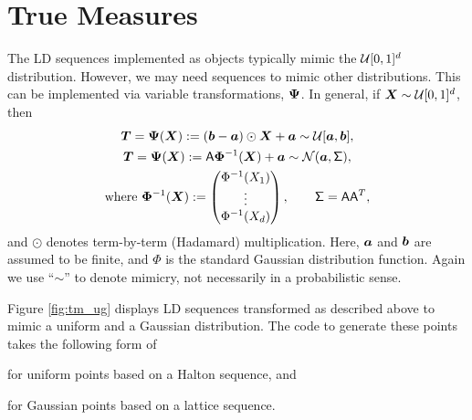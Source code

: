 \documentclass[graybox,footinfo]{svmult}
\newcommand{\mA}{\mathsf{A}}
\newcommand{\mSigma}{\mathsf{\Sigma}}
\begin{document}
\section{True Measures}

The LD sequences implemented as  objects typically mimic the ${\mathcal{U}}[0,1]^d$ distribution.  However, we may need sequences to mimic other distributions.  This can be implemented via variable transformations, ${\boldsymbol{\Psi}}$.  In general, if ${\boldsymbol{X}} \sim {\mathcal{U}}[0,1]^d$, then
\begin{subequations} \label{eq:exampleVarTrans}
\begin{gather}
\bsT = \bsPsi(\bsX) := (\bsb - \bsa) \odot \bsX + \bsa \sim  \calU[\bsa,\bsb], \\
\label{eq:exampleVarTransGauss}
\bsT = \bsPsi(\bsX) := \mA \bsPhi^{-1}(\bsX) + \bsa \sim \calN(\bsa, \mSigma), \\
\nonumber  \text{where }  \bsPhi^{-1}(\bsX) : = \begin{pmatrix} \Phi^{-1}(X_1) \\ \vdots \\ \Phi^{-1}(X_d)\end{pmatrix}, \qquad \mSigma = \mA \mA^T,
\end{gather}
\end{subequations}
and $\odot$ denotes term-by-term (Hadamard) multiplication.  Here, ${\boldsymbol{a}}$ and ${\boldsymbol{b}}$ are assumed to be finite, and $\Phi$ is the standard Gaussian distribution function.  Again we use ``$\sim$'' to denote mimicry, not necessarily in a probabilistic sense.

Figure \ref{fig:tm_ug} displays LD sequences transformed as described above to mimic a uniform and a Gaussian distribution.  The code to generate these points takes the following form of 

for uniform points based on a Halton sequence, and 

for Gaussian points based on a lattice sequence.
\end{document}
